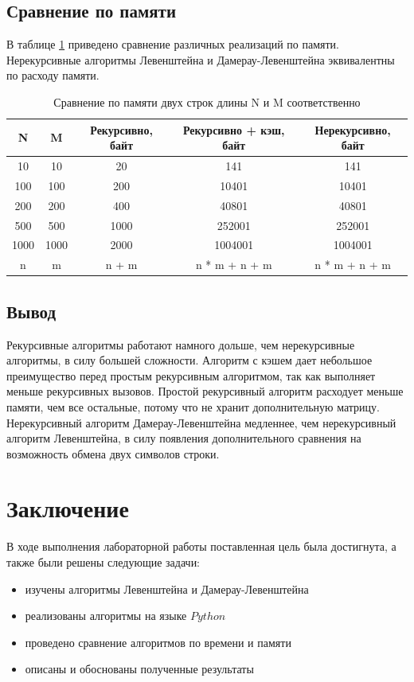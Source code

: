 \documentclass{article}
\begin{document}
\subsection{Сравнение по памяти}
В таблице \ref{tbl:mem_comp} приведено сравнение различных реализаций по памяти. Нерекурсивные алгоритмы
Левенштейна и Дамерау-Левенштейна эквивалентны по расходу памяти.
\clearpage\begin{table}[h]
	\begin{center}
	\caption{\label{tbl:mem_comp} Сравнение по памяти двух строк длины N и M соответственно}
	\begin{tabular}{|c|c|c|c|c|}
		\hline
		N & M & Рекурсивно, байт &  Рекурсивно + кэш, байт & Нерекурсивно, байт
		\\ \hline
		10 & 10 & 20 & 141 & 141
		\\ \hline
		100 & 100 & 200 & 10401 & 10401
		\\ \hline
		200 & 200 & 400 & 40801 & 40801
		\\ \hline
		500 & 500 & 1000 & 252001 & 252001
		\\ \hline
		1000 & 1000 & 2000 & 1004001 & 1004001
		\\ \hline
		n & m & n + m & n * m + n + m & n * m + n + m
		\\ \hline
	\end{tabular}
	\end{center}
\end{table}

\subsection{Вывод}
Рекурсивные алгоритмы работают намного дольше, чем нерекурсивные  алгоритмы, в силу большей сложности.
Алгоритм с кэшем дает небольшое преимущество перед простым рекурсивным алгоритмом, так как выполняет
меньше рекурсивных вызовов. Простой рекурсивный алгоритм расходует меньше  памяти, чем все остальные,
потому что не хранит дополнительную матрицу. Нерекурсивный алгоритм Дамерау-Левенштейна медленнее, чем 
нерекурсивный алгоритм Левенштейна, в силу появления дополнительного сравнения на возможность обмена
двух символов строки.


\clearpage\section*{Заключение}
В ходе выполнения лабораторной работы поставленная цель была достигнута, а также были решены следующие задачи:
\begin{itemize}
	\item изучены алгоритмы Левенштейна и Дамерау-Левенштейна
	\item реализованы алгоритмы на языке $Python$ 
	\item проведено сравнение алгоритмов по времени и памяти
	\item описаны и обоснованы полученные результаты
\end{itemize} 
\end{document}
